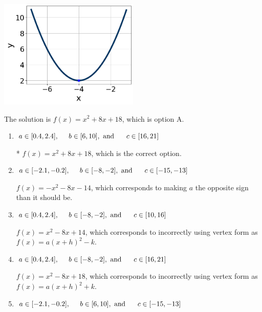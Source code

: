 \documentclass{extbook}[14pt]
\begin{document}
\begin{enumerate}
{\begin{center}
    \includegraphics[width=0.5\textwidth]{../Figures/quadraticGraphToEquationCopyC.png}
\end{center}



The solution is \( f(x) = x^{2} +8 x + 18 \), which is option A.\begin{enumerate}[label=\Alph*.]
\item \( a \in [0.4, 2.4], \hspace*{5mm} b \in [6, 10], \text{ and } \hspace*{5mm} c \in [16, 21] \)

* $f(x)=x^{2} +8 x + 18$, which is the correct option.
\item \( a \in [-2.1, -0.2], \hspace*{5mm} b \in [-8, -2], \text{ and } \hspace*{5mm} c \in [-15, -13] \)

$f(x)=-x^{2} -8 x -14$, which corresponds to making $a$ the opposite sign than it should be.
\item \( a \in [0.4, 2.4], \hspace*{5mm} b \in [-8, -2], \text{ and } \hspace*{5mm} c \in [10, 16] \)

$f(x)=x^{2} -8 x + 14$, which corresponds to incorrectly using vertex form as $f(x) = a(x+h)^2 - k$.
\item \( a \in [0.4, 2.4], \hspace*{5mm} b \in [-8, -2], \text{ and } \hspace*{5mm} c \in [16, 21] \)

$f(x)=x^{2} -8 x + 18$, which corresponds to incorrectly using vertex form as $f(x) = a(x+h)^2+k$.
\item \( a \in [-2.1, -0.2], \hspace*{5mm} b \in [6, 10], \text{ and } \hspace*{5mm} c \in [-15, -13] \)


\end{enumerate}}
\end{enumerate}
\end{document}
